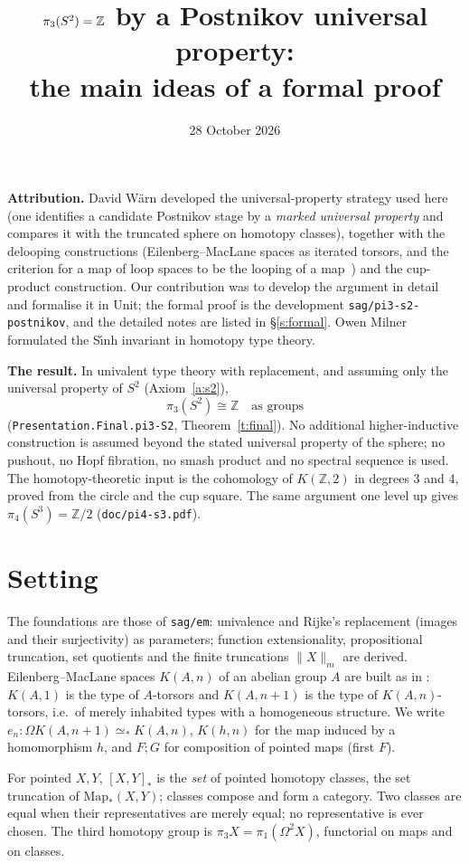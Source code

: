 \documentclass[11pt]{amsart}
\title{$\pi_3(S^2)=\Z$ by a Postnikov universal property:\\ the main ideas of a formal proof}
\date{28 October 2026}
\theoremstyle{definition}
\theoremstyle{remark}
\newcommand{\Om}{\Omega}
\newcommand{\Map}{\mathrm{Map}_*}
\newcommand{\Z}{\mathbb{Z}}
\newcommand{\code}[1]{\texttt{#1}}
\newcommand{\hc}[2]{[#1,#2]_*}
\newcommand{\tr}[1]{\|#1\|}
\begin{document}
\maketitle

\noindent\textbf{Attribution.} David W\"arn developed the
universal-property strategy used here (one identifies a candidate Postnikov stage by a
\emph{marked universal property} and compares it with the truncated sphere on homotopy
classes), together with the delooping constructions (Eilenberg--MacLane spaces as
iterated torsors, and the criterion for a map of loop spaces to be the looping of a
map~\cite{DW1}) and the cup-product construction. Our contribution was to develop the
argument in detail and formalise it in Unit; the formal proof is the development
\code{sag/pi3-s2-postnikov}, and the detailed notes are listed in \S\ref{s:formal}.
Owen Milner formulated the S\'{\i}nh invariant in homotopy type theory.

\smallskip\noindent\textbf{The result.} In univalent type theory with replacement,
and assuming only the universal property of $S^2$ (Axiom~\ref{a:s2}),
\[\pi_3(S^2)\cong\Z\quad\text{as groups}\]
(\code{Presentation.Final.pi3-S2}, Theorem~\ref{t:final}). No additional
higher-inductive construction is assumed beyond the stated universal property of the
sphere; no pushout, no Hopf fibration, no smash product and no spectral sequence is
used. The homotopy-theoretic input is the cohomology of $K(\Z,2)$ in degrees 3 and 4,
proved from the circle and the cup square. The same argument one level up gives
$\pi_4(S^3)=\Z/2$ (\code{doc/pi4-s3.pdf}).

\section{Setting}

The foundations are those of \code{sag/em}: univalence and Rijke's replacement
(images and their surjectivity) as parameters; function extensionality,
propositional truncation, set quotients and the finite truncations $\tr X_m$ are
derived. Eilenberg--MacLane spaces $K(A,n)$ of an abelian group $A$ are built as in
\cite{DW1}: $K(A,1)$ is the type of $A$-torsors and $K(A,n{+}1)$ is the type of
$K(A,n)$-torsors, i.e.\ of merely inhabited types with a homogeneous structure. We
write $e_n:\Om K(A,n{+}1)\simeq_*K(A,n)$, $K(h,n)$ for the map induced by a
homomorphism $h$, and $F;G$ for composition of pointed maps (first $F$).

For pointed $X,Y$, $\hc XY$ is the \emph{set} of pointed homotopy classes, the set
truncation of $\Map(X,Y)$; classes compose and form a category. Two classes are equal
when their representatives are merely equal; no representative is ever chosen. The
third homotopy group is $\pi_3X=\pi_1(\Om^2X)$, functorial on maps and on classes.
\end{document}
